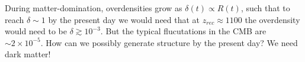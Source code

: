 \documentclass[]{article}
\begin{document}
During matter-domination, overdensities grow as $\delta(t)\propto R(t)$, such
that to reach $\delta\sim1$ by the present day we would need that at $z_{rec}\approx1100$
the overdensity would need to be $\delta\gtrsim10^{-3}$.  But the typical
flucutations in the CMB are $\sim 2\times 10^{-5}$.  How can we possibly generate
structure by the present day?  We need dark matter!
\end{document}
